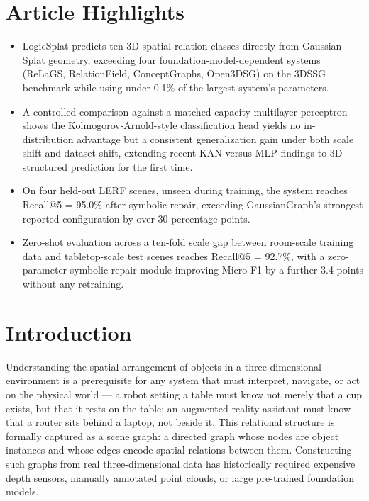 \documentclass[sn-mathphys,Numbered]{sn-jnl}
\begin{document}
\section*{Article Highlights}

\begin{itemize}
\item LogicSplat predicts ten 3D spatial relation classes directly from Gaussian Splat geometry, exceeding four foundation-model-dependent systems (ReLaGS, RelationField, ConceptGraphs, Open3DSG) on the 3DSSG benchmark while using under 0.1\% of the largest system's parameters.
\item A controlled comparison against a matched-capacity multilayer perceptron shows the Kolmogorov-Arnold-style classification head yields no in-distribution advantage but a consistent generalization gain under both scale shift and dataset shift, extending recent KAN-versus-MLP findings to 3D structured prediction for the first time.
\item On four held-out LERF scenes, unseen during training, the system reaches Recall@5 = 95.0\% after symbolic repair, exceeding GaussianGraph's strongest reported configuration by over 30 percentage points.
\item Zero-shot evaluation across a ten-fold scale gap between room-scale training data and tabletop-scale test scenes reaches Recall@5 = 92.7\%, with a zero-parameter symbolic repair module improving Micro F1 by a further 3.4 points without any retraining.
\end{itemize}

\FloatBarrier
\section{Introduction}\label{sec1}

Understanding the spatial arrangement of objects in a three-dimensional environment is a prerequisite for any system that must interpret, navigate, or act on the physical world --- a robot setting a table must know not merely that a cup exists, but that it rests on the table; an augmented-reality assistant must know that a router sits behind a laptop, not beside it. This relational structure is formally captured as a scene graph: a directed graph whose nodes are object instances and whose edges encode spatial relations between them. Constructing such graphs from real three-dimensional data has historically required expensive depth sensors, manually annotated point clouds, or large pre-trained foundation models.
\end{document}
